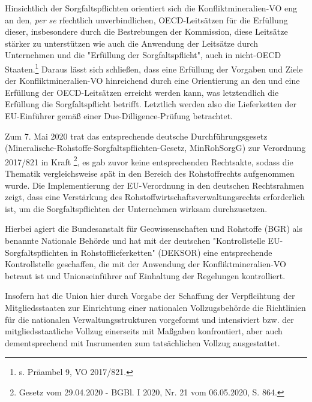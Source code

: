 \documentclass[12pt,a4paper,oneside]{book} %
\begin{document}
	Hinsichtlich der Sorgfaltspflichten orientiert sich die Konfliktmineralien-VO eng an den, \textit{per se} rfechtlich unverbindlichen, OECD-Leitsätzen \autocite{OECDleitfaden2019} für die Erfüllung dieser, insbesondere durch die Bestrebungen der Kommission, diese Leitsätze stärker zu unterstützen wie auch die Anwendung der Leitsätze durch Unternehmen und die "Erfüllung der Sorgfaltspflicht", auch in nicht-OECD Staaten.\footnote{s. Präambel 9, VO 2017/821.} Daraus lässt sich schließen, dass eine Erfüllung der Vorgaben und Ziele der Konfliktmineralien-VO hinreichend durch eine Orientierung an den und eine Erfüllung der OECD-Leitsätzen erreicht werden kann, was letztendlich die Erfüllung die Sorgfaltspflicht betrifft. Letztlich werden also die Lieferketten der EU-Einführer gemäß einer Due-Dilligence-Prüfung betrachtet.\autocite[Rn. 390]{ruttloff_lieferkettensorgfaltspflichtengesetz_2022}
	
	
	
	Zum 7. Mai 2020 trat das entsprechende deutsche Durchführungsgesetz (Mineralische-Rohstoffe-Sorgfaltspflichten-Gesetz, MinRohSorgG) zur Verordnung 2017/821 in Kraft \footnote{Gesetz vom 29.04.2020 - BGBl. I 2020, Nr. 21 vom 06.05.2020, S. 864.}, es gab zuvor keine entsprechenden Rechtsakte, sodass die Thematik vergleichsweise spät in den Bereich des Rohstoffrechts aufgenommen wurde. Die Implementierung der EU-Verordnung in den deutschen Rechtsrahmen zeigt, dass eine Verstärkung des Rohstoffwirtschaftsverwaltungsrechts erforderlich ist, um die Sorgfaltspflichten der Unternehmen wirksam durchzusetzen.
	
	Hierbei agiert die Bundesanstalt für Geowissenschaften und Rohstoffe (BGR) als benannte Nationale Behörde und hat mit der deutschen "Kontrollstelle EU-Sorgfaltspflichten in Rohstofflieferketten" (DEKSOR) eine entsprechende Kontrollstelle geschaffen, die mit der Anwendung der Konfliktmineralien-VO betraut ist und Unionseinführer auf Einhaltung der Regelungen kontrolliert. 
	
	Insofern hat die Union hier durch Vorgabe der Schaffung der Verpflcihtung der Mitgliedsstaaten zur Einrichtung einer nationalen Vollzugsbehörde die Richtlinien für die nationalen Verwaltungsstrukturen vorgeformt und intensiviert bzw. der mitgliedsstaatliche Vollzug einerseits mit Maßgaben konfrontiert, aber auch dementsprechend mit Insrumenten zum tatsächlichen Vollzug ausgestattet.
	
\end{document}
